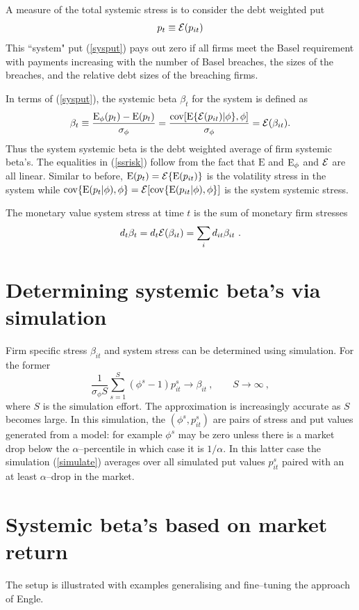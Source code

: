 \documentclass[authoryear]{elsarticle}
\newcommand{\E}{\mathrm{E}}
\newcommand{\cov}{\mathrm{cov}}
\newcommand{\Ex}{{\cal E}}
\newcommand{\eref}[1]{(\ref{#1})}
\newcommand{\cq}{\ , \qquad}
\newcommand{\be}[1]{\begin{equation}\label{#1}}
\newcommand{\ee}{\end{equation}}
\begin{document}
A measure of the total systemic stress is to consider the debt weighted put 
\be{sysput}
p_t\equiv\Ex(p_{it})
\ee
This ``system" put \eref{sysput} pays out zero if all firms meet the Basel requirement with payments increasing with the number of Basel breaches, the sizes of the breaches, and the relative debt sizes of the breaching firms.  

In terms of \eref{sysput}, the  systemic beta $\beta_t$ for the system is defined as
\be{ssrisk}
 \beta_t\equiv\frac{\Es(p_{t}) -\E(p_{t})}{\sigma_\phi} = \frac{\cov[\E\{\Ex(p_{it})|\phi\},\phi]}{\sigma_\phi}=\Ex(\beta_{it}) .
\ee
Thus the system systemic beta is the debt weighted average of firm systemic beta's.  The equalities in \eref{ssrisk} follow from the fact that  $\E$ and $\Es$ and $\Ex$ are all linear.  Similar to before, $\E(p_t)=\Ex\{\E(p_{it})\}$ is the volatility stress in the system while $\cov\{\E(p_t|\phi),\phi\} = \Ex[\cov\{\E(p_{it}|\phi),\phi\}]$ is the system systemic stress.

The monetary value  system stress at time $t$ is the sum of monetary firm stresses
$$
d_t\beta_t = d_t\Ex(\beta_{it}) = \sum_i d_{it}\beta_{it}\ . 
$$


\section{Determining systemic beta's via simulation}

Firm specific stress $\beta_{it}$ and system stress  can be determined using simulation.   For the former
\be{simulate}
\frac{1}{\sigma_\phi S}\sum_{s=1}^S (\phi^s-1)p_{it}^s\rightarrow \beta_{it} \cq S\rightarrow\infty\ ,
\ee
where $S$ is the simulation effort.  The approximation is increasingly accurate as $S$ becomes large.  In this simulation, the $(\phi^s,p_{it}^s)$ are pairs of stress and put values generated from a model: for example $\phi^s$ may be zero unless there is a market drop below the $\alpha$--percentile in which case it is $1/\alpha$.   In this latter case the simulation \eref{simulate} averages over all simulated put values $p_{it}^s$ paired with an at least $\alpha$--drop in the market.





\section{Systemic beta's based on  market return}
The setup is illustrated with  examples generalising and fine--tuning the approach of Engle.
\end{document}
